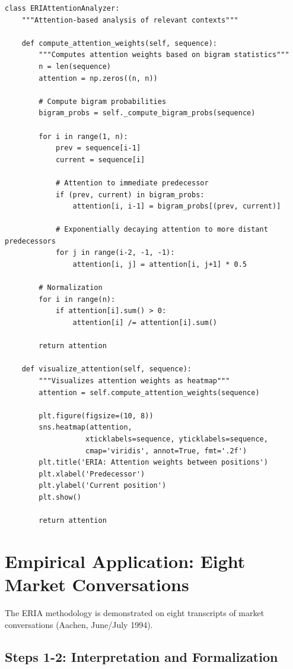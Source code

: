 \documentclass[12pt,a4paper]{article}
\begin{document}
\begin{lstlisting}[caption=Attention analysis in ERIA]
class ERIAttentionAnalyzer:
    """Attention-based analysis of relevant contexts"""
    
    def compute_attention_weights(self, sequence):
        """Computes attention weights based on bigram statistics"""
        n = len(sequence)
        attention = np.zeros((n, n))
        
        # Compute bigram probabilities
        bigram_probs = self._compute_bigram_probs(sequence)
        
        for i in range(1, n):
            prev = sequence[i-1]
            current = sequence[i]
            
            # Attention to immediate predecessor
            if (prev, current) in bigram_probs:
                attention[i, i-1] = bigram_probs[(prev, current)]
            
            # Exponentially decaying attention to more distant predecessors
            for j in range(i-2, -1, -1):
                attention[i, j] = attention[i, j+1] * 0.5
        
        # Normalization
        for i in range(n):
            if attention[i].sum() > 0:
                attention[i] /= attention[i].sum()
        
        return attention
    
    def visualize_attention(self, sequence):
        """Visualizes attention weights as heatmap"""
        attention = self.compute_attention_weights(sequence)
        
        plt.figure(figsize=(10, 8))
        sns.heatmap(attention, 
                   xticklabels=sequence, yticklabels=sequence,
                   cmap='viridis', annot=True, fmt='.2f')
        plt.title('ERIA: Attention weights between positions')
        plt.xlabel('Predecessor')
        plt.ylabel('Current position')
        plt.show()
        
        return attention
\end{lstlisting}

\section{Empirical Application: Eight Market Conversations}

The ERIA methodology is demonstrated on eight transcripts of market conversations (Aachen, June/July 1994).

\subsection{Steps 1-2: Interpretation and Formalization}
\end{document}

